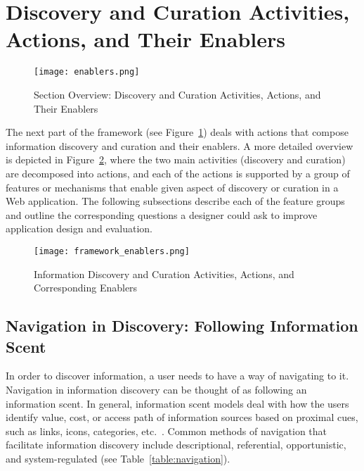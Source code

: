 {\section{Discovery and Curation Activities, Actions, and Their Enablers}
\label{section:enablers}

\begin{figure}[ht!]
	\noindent
	\centering
	\texttt{[image: enablers.png]}
	\caption{Section Overview: Discovery and Curation Activities, Actions, and Their Enablers}
	\label{fig:enablers_overview} 
\end{figure}
The next part of the framework (see Figure~\ref{fig:enablers_overview}) deals with actions that compose information discovery and curation and their enablers. A more detailed overview is depicted in Figure~\ref{fig:enablers}, where the two main activities (discovery and curation) are decomposed into actions, and each of the actions is supported by a group of features or mechanisms that enable given aspect of discovery or curation in a Web application.  The following subsections describe each of the feature groups and outline the corresponding questions a designer could ask to improve application design and evaluation.  

\begin{figure}[ht!]
	\noindent
	\centering
	\texttt{[image: framework\_enablers.png]}
	\caption{Information Discovery and Curation Activities, Actions, and Corresponding Enablers}
	\label{fig:enablers} 
\end{figure}

\pagebreak

{\subsection{Navigation in Discovery: Following Information Scent}
In order to discover information, a user needs to have a way of navigating to it. Navigation in information discovery can be thought of as following an information scent. In general, information scent models deal with how the users identify value, cost, or access path of information sources based on proximal cues, such as links, icons, categories, etc.~\cite{pirolli1999information}. Common methods of navigation that facilitate information discovery include descriptional, referential, opportunistic, and system-regulated (see Table~\ref{table:navigation}). 


}}
